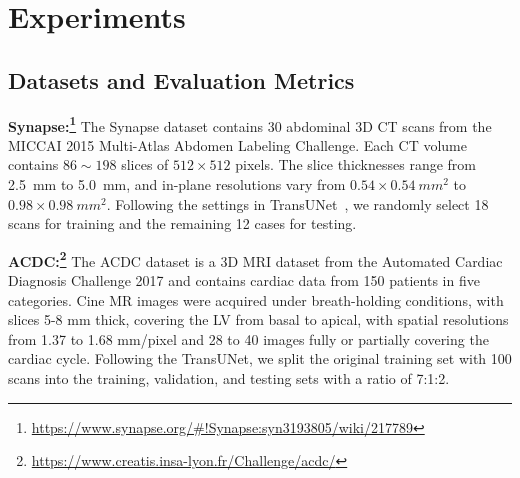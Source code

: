 \documentclass[runningheads]{llncs}
\begin{document}

\section{Experiments}
\subsection{Datasets and Evaluation Metrics}

\textbf{Synapse:\footnote{\url{https://www.synapse.org/\#!Synapse:syn3193805/wiki/217789}}} The Synapse dataset contains 30 abdominal 3D CT scans from the  MICCAI 2015 Multi-Atlas Abdomen Labeling Challenge. Each CT volume contains $86\sim 198$ slices of $512\times512$ pixels. The slice thicknesses range from 2.5~mm to 5.0~mm, and in-plane resolutions vary from $0.54 \times 0.54~mm^2$ to $0.98 \times 0.98~mm^2$. Following the settings in TransUNet~\cite{chen2021transunet}, we randomly select 18 scans for training and the remaining 12 cases for testing.

\noindent\textbf{ACDC:\footnote{\url{https://www.creatis.insa-lyon.fr/Challenge/acdc/}}} The ACDC dataset is a 3D MRI dataset from the Automated Cardiac Diagnosis Challenge 2017 and contains cardiac data from 150 patients in five categories. Cine MR images were acquired under breath-holding conditions, with slices 5-8 mm thick, covering the LV from basal to apical, with spatial resolutions from 1.37 to 1.68 mm/pixel and 28 to 40 images fully or partially covering the cardiac cycle. Following the TransUNet, we split the original training set with 100 scans into the training, validation, and testing sets with a ratio of 7:1:2.
\end{document}
